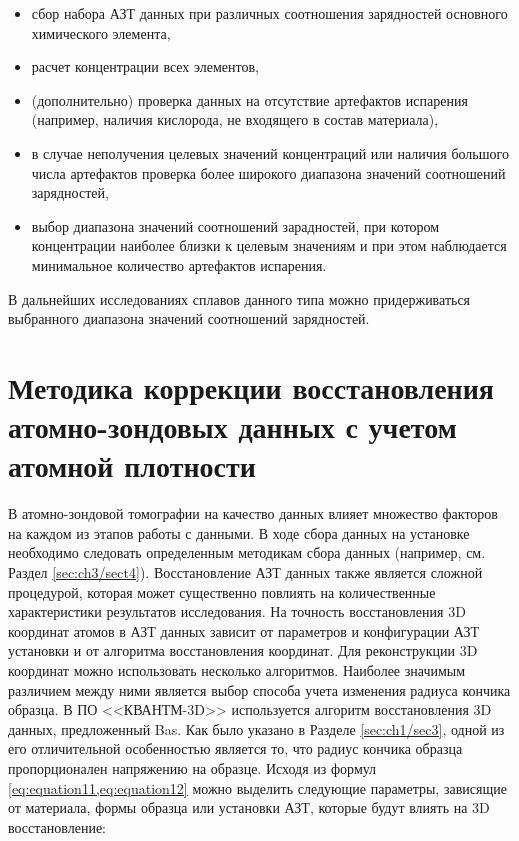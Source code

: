 \begin{itemize}
	\item сбор набора АЗТ данных при различных соотношения зарядностей основного химического элемента,
	\item расчет концентрации всех элементов,	
	\item (дополнительно) проверка данных на отсутствие артефактов испарения (например, наличия кислорода, не входящего в состав материала),
	\item в случае неполучения целевых значений концентраций или наличия большого числа артефактов проверка более широкого диапазона значений соотношений зарядностей,
	\item выбор диапазона значений соотношений зарадностей, при котором концентрации наиболее близки к целевым значениям и при этом наблюдается минимальное количество артефактов испарения.	
\end{itemize}

В дальнейших исследованиях сплавов данного типа можно придерживаться выбранного диапазона значений соотношений зарядностей.

\FloatBarrier



\section{Методика коррекции восстановления атомно-зондовых данных с учетом атомной плотности}\label{sec:ch3/sect5}

В атомно-зондовой томографии на качество данных влияет множество факторов на каждом из этапов работы с данными. В ходе сбора данных на установке необходимо следовать определенным методикам сбора данных (например, см. Раздел \cref{sec:ch3/sect4}). Восстановление АЗТ данных также является сложной процедурой, которая может существенно повлиять на количественные характеристики результатов исследования. На точность восстановления 3D координат атомов в АЗТ данных зависит от параметров и конфигурации АЗТ установки и от алгоритма восстановления координат. Для реконструкции 3D координат можно использовать несколько алгоритмов. Наиболее значимым различием между ними является выбор способа учета изменения радиуса кончика образца. В ПО <<КВАНТМ-3D>> используется алгоритм восстановления 3D данных, предложенный Bas. Как было указано в Разделе \cref{sec:ch1/sec3}, одной из его отличительной особенностью является то, что радиус кончика образца пропорционален напряжению на образце. Исходя из формул \cref{eq:equation11,eq:equation12} можно выделить следующие параметры, зависящие от материала, формы образца или установки АЗТ, которые будут влиять на 3D восстановление:

